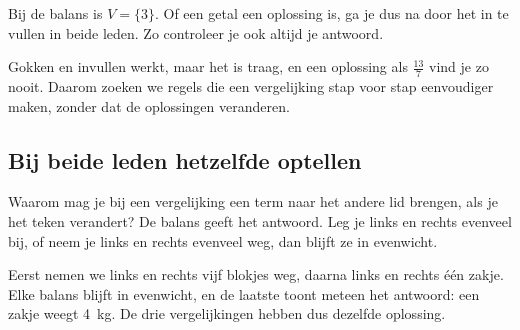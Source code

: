 Bij de balans is $V = \{3\}$. Of een getal een oplossing is, ga je dus na door het in te vullen in beide leden. Zo controleer je ook altijd je antwoord.


\begin{oefeningen}
\end{oefeningen}

Gokken en invullen werkt, maar het is traag, en een oplossing als $\tfrac{13}{7}$ vind je zo nooit. Daarom zoeken we regels die een vergelijking stap voor stap eenvoudiger maken, zonder dat de oplossingen veranderen.

\subsection{Bij beide leden hetzelfde optellen}

Waarom mag je bij een vergelijking een term naar het andere lid brengen, als je het teken verandert? De balans geeft het antwoord. Leg je links en rechts evenveel bij, of neem je links en rechts evenveel weg, dan blijft ze in evenwicht.


Eerst nemen we links en rechts vijf blokjes weg, daarna links en rechts één zakje. Elke balans blijft in evenwicht, en de laatste toont meteen het antwoord: een zakje weegt 4~kg. De drie vergelijkingen hebben dus dezelfde oplossing.

